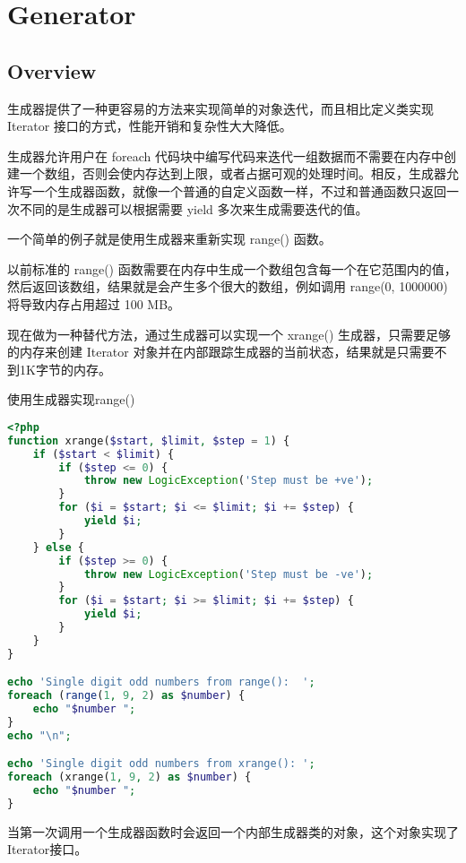 \part{Generator}


\chapter{Overview}

生成器提供了一种更容易的方法来实现简单的对象迭代，而且相比定义类实现 Iterator 接口的方式，性能开销和复杂性大大降低。

生成器允许用户在 foreach 代码块中编写代码来迭代一组数据而不需要在内存中创建一个数组，否则会使内存达到上限，或者占据可观的处理时间。相反，生成器允许写一个生成器函数，就像一个普通的自定义函数一样，不过和普通函数只返回一次不同的是生成器可以根据需要 yield 多次来生成需要迭代的值。


一个简单的例子就是使用生成器来重新实现 range() 函数。 

以前标准的 range() 函数需要在内存中生成一个数组包含每一个在它范围内的值，然后返回该数组，结果就是会产生多个很大的数组，例如调用 range(0, 1000000) 将导致内存占用超过 100 MB。

现在做为一种替代方法，通过生成器可以实现一个 xrange() 生成器，只需要足够的内存来创建 Iterator 对象并在内部跟踪生成器的当前状态，结果就是只需要不到1K字节的内存。




\begin{example}
使用生成器实现range()
\begin{lstlisting}[language=PHP]
<?php
function xrange($start, $limit, $step = 1) {
    if ($start < $limit) {
        if ($step <= 0) {
            throw new LogicException('Step must be +ve');
        }
        for ($i = $start; $i <= $limit; $i += $step) {
            yield $i;
        }
    } else {
        if ($step >= 0) {
            throw new LogicException('Step must be -ve');
        }
        for ($i = $start; $i >= $limit; $i += $step) {
            yield $i;
        }
    }
}

echo 'Single digit odd numbers from range():  ';
foreach (range(1, 9, 2) as $number) {
    echo "$number ";
}
echo "\n";

echo 'Single digit odd numbers from xrange(): ';
foreach (xrange(1, 9, 2) as $number) {
    echo "$number ";
}
\end{lstlisting}
\end{example}

当第一次调用一个生成器函数时会返回一个内部生成器类的对象，这个对象实现了Iterator接口。

